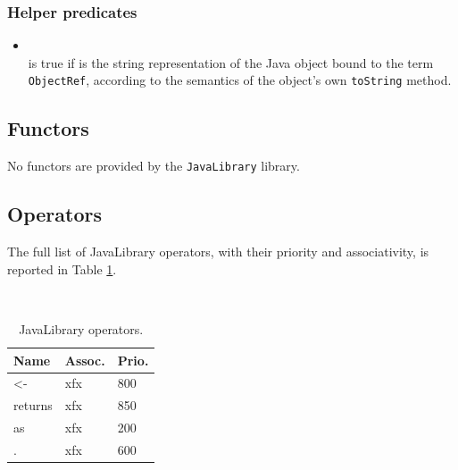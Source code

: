 \subsubsection{Helper predicates}

\begin{itemize}
\item {}\\
    \noindent{} is true if
     is the string representation of the Java object bound to the term \texttt{ObjectRef}, according to the semantics of the object's own \texttt{toString} method.

\end{itemize}

\subsection{Functors}

No functors are provided by the \texttt{JavaLibrary} library.

\subsection{Operators}

The full list of JavaLibrary operators, with their priority and associativity, is reported in Table \ref{tab:javalibrary-operators}.

\begin{table}[h]
    \begin{center}{\small\tt
    \begin{tabular}{p{2cm}|p{1cm}|p{1cm}}\hline\hline
    Name & Assoc. & Prio. \\ \hline\hline
    <-   & xfx & 800\\
    returns     & xfx & 850 \\
    as   & xfx & 200\\
    .   & xfx & 600\\
    \hline\hline
    \end{tabular}
    }\end{center}
    \caption{JavaLibrary operators.}\label{tab:javalibrary-operators}
\end{table}

